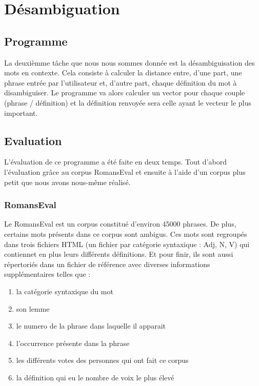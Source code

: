 \section{Désambiguation}
\subsection{Programme}

La deuxièmme tâche que nous nous sommes donnée est la désambiguisation des mots
en contexte. Cela consiste à calculer la distance entre, d'une part, une
phrase entrée par l'utilisateur et, d'autre part, chaque définition du mot à
disambiguïser. Le programme va alors calculer un vector pour chaque couple
(phrase / définition) et la définition renvoyée sera celle ayant le vecteur le
plus important.



\subsection{Evaluation}

L'évaluation de ce programme a été faite en deux temps. Tout d'abord 
l'évaluation grâce au corpus RomansEval et ensuite à l'aide d'un corpus plus 
petit que nous avons nous-même réalisé.

\subsubsection{RomansEval}

Le RomansEval est un corpus constitué d'environ 45000 phrases. De plus, 
certains mots présents dans ce corpus sont ambigus. Ces mots sont regroupés dans 
trois fichiers HTML (un fichier par catégorie syntaxique : Adj, N, V) qui 
contiennet en plus leurs différents définitions. Et pour finir, ils sont aussi 
répertoriés dans un fichier de référence avec diverses informations 
supplémentaires telles que :

\begin{enumerate}
 \item la catégorie syntaxique du mot
 \item son lemme
 \item le numero de la phrase dans laquelle il apparait
 \item l'occurrence présente dans la phrase
 \item les différents votes des personnes qui ont fait ce corpus
 \item la définition qui eu le nombre de voix le plus élevé
 \end{enumerate}

